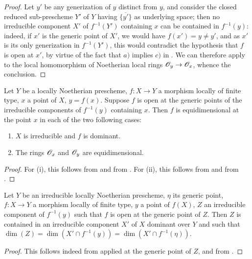 \begin{proof}
Let $y'$ be any generization of $y$ distinct from $y$, and consider the closed reduced sub-prescheme $Y'$ of $Y$ having $\overline{\{y'\}}$ as underlying space; then no irreducible component $X'$ of $f^{-1}(Y')$ containing $x$ can be contained in $f^{-1}(y)$: indeed, if $x'$ is the generic point of $X'$, we would have $f(x')=y\neq y'$, and as $x'$ is its only generization in $f^{-1}(Y')$, this would contradict the hypothesis that $f$ is open at $x'$, by virtue of the fact that $a)$ implies $c)$ in .
We can therefore apply  to the local homomorphism of Noetherian local rings $\mathscr{O}_y\to\mathscr{O}_x$, whence the conclusion.
\end{proof}

\begin{corollary}[14.2.2]
\label{IV.14.2.2}
Let $Y$ be a locally Noetherian prescheme, $f:X\to Y$ a morphism locally of finite type, $x$ a point of $X$, $y=f(x)$.
Suppose $f$ is open at the generic points of the irreducible components of $f^{-1}(y)$ containing $x$.
Then $f$ is equidimensional at the point $x$ in each of the two following cases:
\begin{enumerate}[label=(\roman*)]
  \item $X$ is irreducible and $f$ is dominant.
  \item The rings $\mathscr{O}_x$ and $\mathscr{O}_y$ are equidimensional.
\end{enumerate}
\end{corollary}

\begin{proof}
For (i), this follows from  and from .
For (ii), this follows from  and from .
\end{proof}

\begin{proposition}[14.2.3]
\label{IV.14.2.3}
Let $Y$ be an irreducible locally Noetherian prescheme, $\eta$ its generic point, $f:X\to Y$ a morphism locally of finite type, $y$ a point of $f(X)$, $Z$ an irreducible component of $f^{-1}(y)$ such that $f$ is open at the generic point of $Z$.
Then $Z$ is contained in an irreducible component $X'$ of $X$ dominant over $Y$ and such that $\dim(Z)=\dim(X'\cap f^{-1}(y))=\dim(X'\cap f^{-1}(\eta))$.
\end{proposition}

\begin{proof}
This follows indeed from  applied at the generic point of $Z$, and from .
\end{proof}

